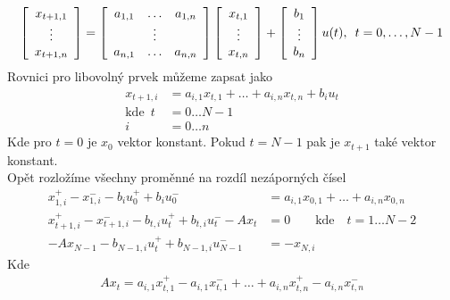 \documentclass[12pt]{article}
\begin{document}
    \begin{align*}
        \left[\begin{array}{c}
                  x_{t+1,1}\\
                  \vdots\\
                  x_{t+1,n}
        \end{array}\right] =
        \left[\begin{array}{c c c}
                  a_{1,1}& \ldots &a_{1,n}\\
                  &\vdots&\\
                  a_{n,1}& \ldots &a_{n,n}
        \end{array}\right]
        \left[\begin{array}{c}
                  x_{t,1}\\
                  \vdots\\
                  x_{t,n}
        \end{array}\right]+
        \left[\begin{array}{c}
                  b_{1}\\
                  \vdots\\
                  b_{n}
        \end{array}\right] u(t), \enspace t = 0,\ldots,N-1
    \end{align*}
    Rovnici pro libovolný prvek můžeme zapsat jako
    \begin{align*}
        x_{t+1,i} &= a_{i,1}x_{t,1}+\ldots + a_{i,n}x_{t,n} + b_{i}u_t\\
        \text{kde}\enspace t &= 0\dots N-1\\
        i &= 0\dots n
    \end{align*}
    Kde pro \(t = 0\) je \(x_0\) vektor konstant.
    Pokud \(t=N-1\) pak je \(x_{t+1}\) také vektor konstant.\\
    Opět rozložíme všechny proměnné na rozdíl nezáporných čísel
    \begin{align*}
        x_{1,i}^+ - x_{1,i}^- - b_{i}u_0^+ + b_{i}u_0^- &= a_{i,1}x_{0,1}+\dots + a_{i,n}x_{0,n} \\
        x_{t+1,i}^+ - x_{t+1,i}^- - b_{t,i}u_t^+ + b_{t,i}u_t^- - Ax_t&= 0 \qquad \text{kde} \quad t = 1\dots N-2 \\
        - Ax_{N-1} - b_{N-1,i}u_t^+ + b_{N-1,i}u_{N-1}^-&= -x_{N,i}
    \end{align*}
    Kde
    \begin{align*}
        Ax_t = a_{i,1}x_{t,1}^+ - a_{i,1}x_{t,1}^- +\dots + a_{i,n}x_{t,n}^+ - a_{i,n}x_{t,n}^-
    \end{align*}
\end{document}
